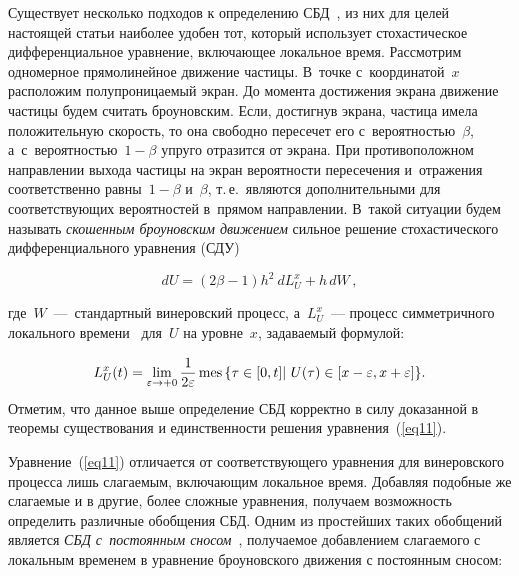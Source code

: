 \begin{multicols}{2}
Существует несколько подходов к определению СБД~\cite{ref19}, из них для целей настоящей статьи наиболее удобен тот, который использует стохастическое дифференциальное уравнение, включающее локальное время. Рассмотрим одномерное прямолинейное движение частицы. В~точке с~координатой~$x$ расположим полупроницаемый экран. До момента достижения экрана движение частицы будем считать броуновским. Если, достигнув экрана, частица имела положительную скорость, то она свободно пересечет его с~вероятностью~$\beta$, а~с~вероятностью~$1-\beta$ упруго отразится от экрана. При противоположном направлении выхода частицы на экран вероятности пересечения и~отражения соответственно равны~$1-\beta$ и~$\beta$,
т.\,е.\ являются дополнительными для соответствующих вероятностей в~прямом направлении. В~такой ситуации будем называть {\it скошенным броуновским движением} сильное решение стохастического дифференциального уравнения (СДУ)~\cite{ref19}

\vspace*{2pt}

\noindent
\begin{equation}
  \label{eq11}
  dU =(2\beta -1)h^2\ dL^x_U +  h\, dW\,,
\end{equation}

\vspace*{-2pt}

\noindent
где~$W$~---~стандартный винеровский процесс, а~$L^x_U$~--- процесс симметричного локального времени~\cite{ref18} для~$U$ на уровне~$x$, задаваемый формулой:

\noindent
\begin{equation*}
  L^x_U(t) = \lim \limits_{\varepsilon \to +0} \displaystyle\frac{\displaystyle 1\mathstrut}{\displaystyle 2\varepsilon\mathstrut}\, \mathrm{mes}\, \{\tau \in [0, t]|\  U(\tau) \in [x- \varepsilon, x+ \varepsilon]\}.
\end{equation*}
Отметим, что данное выше определение СБД корректно в силу доказанной
в~\cite{ref20} теоремы существования и единственности решения уравнения~(\ref{eq11}).

Уравнение~(\ref{eq11}) отличается от соответствующего уравнения для винеровского процесса лишь слагаемым, включающим локальное время. Добавляя подобные же слагаемые и в другие, более сложные уравнения, получаем возможность определить различные обобщения СБД. Одним из простейших таких обобщений является {\it СБД с~постоянным сносом}~\cite{ref21}, получаемое добавлением слагаемого с локальным временем в уравнение броуновского движения с постоянным сносом:

\vspace*{2pt}


\end{multicols}
